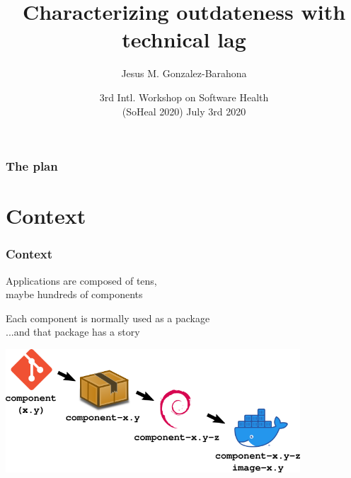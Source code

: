\documentclass[17pt,aspectratio=169,hyperref={pdfusetitle,colorlinks,allcolors=olive}]{beamer}
\title[Technical Lag Outdateness]{Characterizing outdateness with technical lag}
\author[Jesus M. Gonzalez-Barahona]{Jesus M. Gonzalez-Barahona}
\institute[URJC]{Universidad Rey Juan Carlos \\
  @jgbarah ~~~~~ \url{https://jgbarah.github.io/presentations}}
\date{3rd Intl. Workshop on Software Health \\
(SoHeal 2020) July 3rd 2020}
\begin{document}
\begin{frame}
  \maketitle
\end{frame}



\begin{frame}
  \frametitle{The plan}

  \tableofcontents

\end{frame}

\section{Context}

\begin{frame}[fragile]
  \frametitle{Context}

  Applications are composed of tens, \\
  maybe hundreds of components \\

  \vspace{1cm}

  Each component is normally used as a package \\
  ...and that package has a story \\
\end{frame}

\begin{frame}[fragile]
  
  \begin{center}
  \includegraphics[width=11cm]{figs/component-pkgs}
  \end{center}
    
\end{frame}
\end{document}
